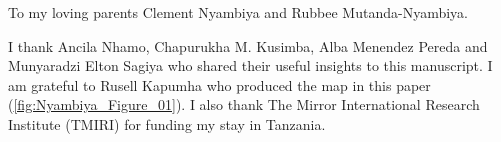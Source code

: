 To my loving parents Clement Nyambiya and Rubbee Mutanda-Nyambiya.

I thank Ancila Nhamo, Chapurukha M. Kusimba,
Alba Menendez Pereda and Munyaradzi Elton Sagiya who shared their useful insights to this manuscript.
I am grateful to Rusell Kapumha who produced the map in this paper (\cref{fig:Nyambiya_Figure_01}).
I also thank The Mirror International Research Institute (TMIRI) for funding my stay in Tanzania.

\IJSRAclosing%
